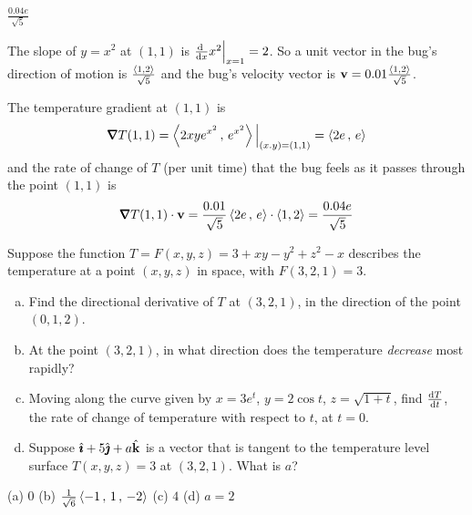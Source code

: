 %

\begin{answer}
$\frac{0.04 e}{\sqrt{5}} $
\end{answer}

\begin{solution}
The slope of $y=x^2$ at $(1,1)$ is $\diff{}{x}x^2\Big|_{x=1}=2$.
So a unit vector in the bug's direction of motion is 
$\frac{\left< 1,2\right>}{\sqrt{5}}$ and the bug's velocity vector is
$\mathbf{v}=0.01\frac{\left< 1,2\right>}{\sqrt{5}}$.

The temperature gradient at $(1,1)$ is
\begin{align*}
\vnabla T(1,1) = \llt 2xy e^{x^2}\,,\,e^{x^2}\rgt\Big|_{(x.y)=(1,1)}
               =\llt 2e\,,\,e\rgt
\end{align*}
and the rate of change of $T$ (per unit time) that the bug feels as it 
passes through the point $(1, 1)$ is
\begin{align*}
\vnabla T(1,1)\cdot \vv
=\frac{0.01}{\sqrt{5}} \llt 2e\,,\,e\rgt\cdot \llt 1,2\rgt
=\frac{0.04 e}{\sqrt{5}} 
\end{align*}
\end{solution}

\begin{question}[M200 2010D] %
Suppose the function $T=F(x,y,z)=3+xy-y^2+z^2-x$ describes the temperature at
a point $(x,y,z)$ in space, with $F(3,2,1)=3$.
\begin{enumerate}[(a)]
\item
Find the directional derivative of $T$ at $(3, 2, 1)$, in the direction of the
point $(0,1,2)$.
\item
At the point $(3, 2, 1)$, in what direction does the temperature
\emph{decrease}  most rapidly?
\item
Moving along the curve given by $x=3e^t$,  $y = 2 \cos t$, $z= \sqrt{1 + t}$, 
find $\diff{T}{t}$, the rate of change of temperature with respect to $t$, at $t = 0$.
\item
Suppose $\hat{\pmb{\imath}}+5\hat{\pmb{\jmath}}+a\hat{\mathbf{k}}$ is a vector that is tangent to the temperature level surface
$T(x, y, z) = 3$ at $(3, 2, 1)$. What is $a$?
\end{enumerate}
\end{question}

%

\begin{answer}
(a) $0$\qquad
(b) $ \frac{1}{\sqrt{6}}\left< -1\,,\,1\,,\,-2 \right> $\qquad
(c) $4$\qquad
(d) $a=2$
\end{answer}

